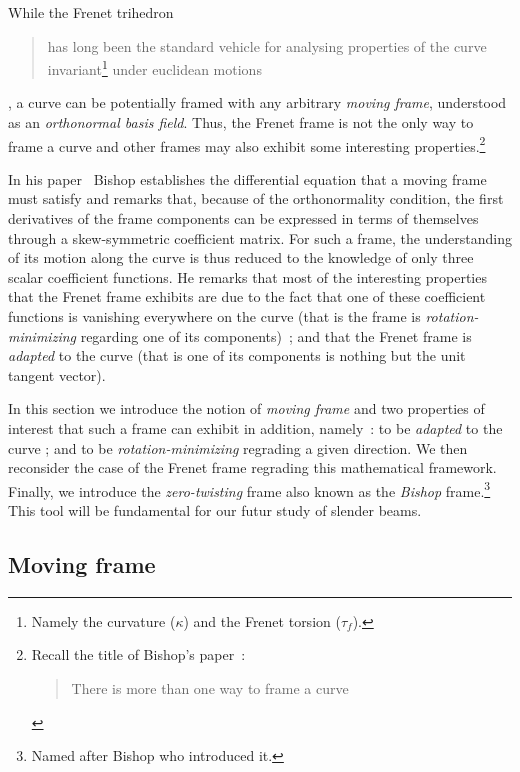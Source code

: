 
While the Frenet trihedron \blockcquote[p.1]{Bishop1975}{has long been the standard vehicle for analysing properties of the curve invariant\footnote{Namely the curvature ($\kappa$) and the Frenet torsion ($\tau_f$).} under euclidean motions}, a curve can be potentially framed with any arbitrary \emph{moving frame}, understood as an \emph{orthonormal basis field}. Thus, the Frenet frame is not the only way to frame a curve and other frames may also exhibit some interesting properties.\footnote{Recall the title of Bishop's paper~: \blockcquote[]{Bishop1975}{There is more than one way to frame a curve}.} 

In his paper~\cite{Bishop1975} Bishop establishes the differential equation that a moving frame must satisfy and remarks that, because of the orthonormality condition, the first derivatives of the frame components can be expressed in terms of themselves through a skew-symmetric coefficient matrix. For such a frame, the understanding of its motion along the curve is thus reduced to the knowledge of only three scalar coefficient functions. He remarks that most of the interesting properties that the Frenet frame exhibits are due to the fact that one of these coefficient functions is vanishing everywhere on the curve (that is the frame is \emph{rotation-minimizing} regarding one of its components)~; and that the Frenet frame is \emph{adapted} to the curve (that is one of its components is nothing but the unit tangent vector).

In this section we introduce the notion of \emph{moving frame} and two properties of interest that such a frame can exhibit in addition, namely~: to be \emph{adapted} to the curve ; and to be \emph{rotation-minimizing} regrading a given direction. We then reconsider the case of the Frenet frame regrading this mathematical framework. Finally, we introduce the \emph{zero-twisting} frame also known as the \emph{Bishop} frame.\footnote{Named after Bishop who introduced it.} This tool will be fundamental for our futur study of slender beams.

\subsection{Moving frame}\label{sec=moving_frame}

